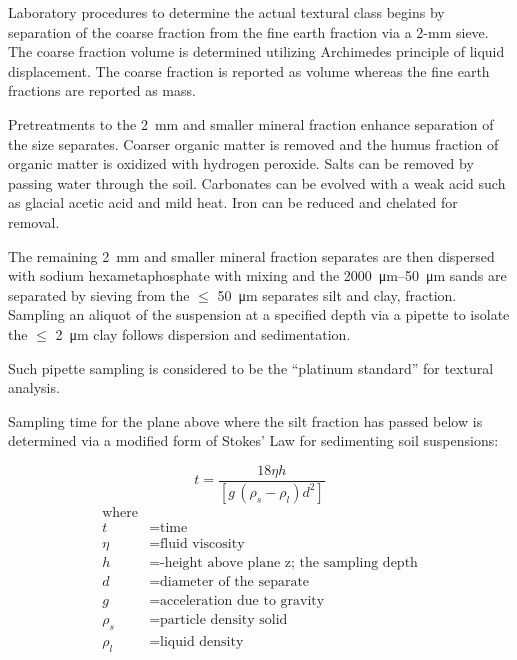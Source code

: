 \documentclass[letterpaper, 12pt]{article}
\begin{document}
Laboratory procedures to determine the actual textural class begins by separation of the coarse fraction from the fine earth fraction via a 2-mm sieve. The coarse fraction volume is determined utilizing Archimedes principle of liquid displacement. The coarse fraction is reported as volume whereas the fine earth fractions are reported as mass.

Pretreatments to the 2~mm and smaller mineral fraction enhance separation of the size separates. Coarser organic matter is removed and the humus fraction of organic matter is oxidized with hydrogen peroxide. Salts can be removed by passing water through the soil. Carbonates can be evolved with a weak acid such as glacial acetic acid and mild heat. Iron can be reduced and chelated for removal.

The remaining \qty{2}{mm} and smaller mineral fraction separates are then dispersed with sodium hexametaphosphate with mixing and the \qtyrange{2000}{50}{\micro\metre} sands are separated by sieving from the $\leq$ \qty{50}{\micro\metre} separates silt and clay, fraction. Sampling an aliquot of the suspension at a specified depth via a pipette to isolate the $\leq$ \qty{2}{\micro\metre} clay follows dispersion and sedimentation.

Such pipette sampling is considered to be the “platinum standard” for textural analysis.

Sampling time for the plane above where the silt fraction has passed below is determined via a modified form of Stokes’ Law for sedimenting soil suspensions:

\noindent\begin{minipage}{\textwidth}
\begin{equation}
    t=\frac{18\eta h}{[g\,(\rho_s - \rho_l)d^2]}
\end{equation}
\begin{equation*}
    \begin{aligned}
        \text{where}                                          \\
        t &= \text{time}                                      \\
        \eta &= \text{fluid viscosity}                        \\
        h &= \text{-height above plane z; the sampling depth} \\
        d &= \text{diameter of the separate}                  \\
        g &= \text{acceleration due to gravity}               \\
        \rho_s &= \text{particle density solid}               \\
        \rho_l &= \text{liquid density}
    \end{aligned}
\end{equation*}
\end{minipage}
        
\end{document}
